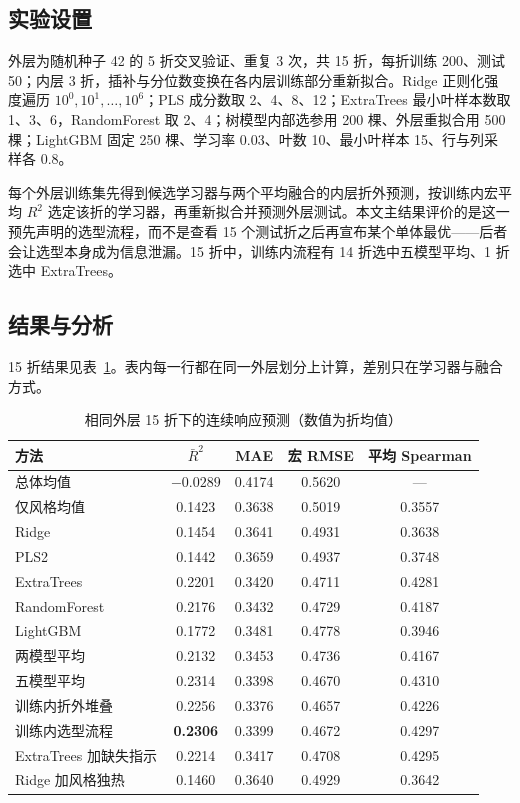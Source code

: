 \documentclass[UTF8,a4paper,zihao=-4]{ctexart}
\numberwithin{figure}{section}
\numberwithin{table}{section}
\numberwithin{equation}{section}
\begin{document}
\subsection{实验设置}

外层为随机种子 42 的 5 折交叉验证、重复 3 次，共 15 折，每折训练 200、测试 50；内层 3 折，插补与分位数变换在各内层训练部分重新拟合。Ridge 正则化强度遍历 $10^{0},10^{1},\dots,10^{6}$；PLS 成分数取 2、4、8、12；ExtraTrees 最小叶样本数取 1、3、6，RandomForest 取 2、4；树模型内部选参用 200 棵、外层重拟合用 500 棵；LightGBM 固定 250 棵、学习率 0.03、叶数 10、最小叶样本 15、行与列采样各 0.8。

每个外层训练集先得到候选学习器与两个平均融合的内层折外预测，按训练内宏平均 $R^2$ 选定该折的学习器，再重新拟合并预测外层测试。本文主结果评价的是这一预先声明的选型流程，而不是查看 15 个测试折之后再宣布某个单体最优——后者会让选型本身成为信息泄漏。15 折中，训练内流程有 14 折选中五模型平均、1 折选中 ExtraTrees。

\subsection{结果与分析}

15 折结果见表~\ref{tab:q1-results}。表内每一行都在同一外层划分上计算，差别只在学习器与融合方式。

\begin{table}[H]
  \centering
  \caption{相同外层 15 折下的连续响应预测（数值为折均值）}
  \label{tab:q1-results}
  \small
  \begin{tabularx}{\textwidth}{@{}>{\raggedright\arraybackslash}X c c c c@{}}
    \toprule
    方法 & $\bar R^{2}$ & MAE & 宏 RMSE & 平均 Spearman \\
    \midrule
    总体均值 & $-0.0289$ & 0.4174 & 0.5620 & — \\
    仅风格均值 & 0.1423 & 0.3638 & 0.5019 & 0.3557 \\
    Ridge & 0.1454 & 0.3641 & 0.4931 & 0.3638 \\
    PLS2 & 0.1442 & 0.3659 & 0.4937 & 0.3748 \\
    ExtraTrees & 0.2201 & 0.3420 & 0.4711 & 0.4281 \\
    RandomForest & 0.2176 & 0.3432 & 0.4729 & 0.4187 \\
    LightGBM & 0.1772 & 0.3481 & 0.4778 & 0.3946 \\
    两模型平均 & 0.2132 & 0.3453 & 0.4736 & 0.4167 \\
    五模型平均 & 0.2314 & 0.3398 & 0.4670 & 0.4310 \\
    训练内折外堆叠 & 0.2256 & 0.3376 & 0.4657 & 0.4226 \\
    训练内选型流程 & \textbf{0.2306} & 0.3399 & 0.4672 & 0.4297 \\
    ExtraTrees 加缺失指示 & 0.2214 & 0.3417 & 0.4708 & 0.4295 \\
    Ridge 加风格独热 & 0.1460 & 0.3640 & 0.4929 & 0.3642 \\
    \bottomrule
  \end{tabularx}
\end{table}
\end{document}
